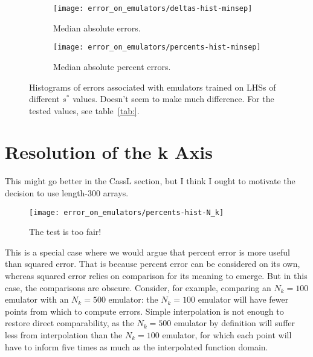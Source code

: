 \begin{figure}[ht!]
    \begin{subfigure}{0.35 \textheight}
    \centering
 		\texttt{[image: error\_on\_emulators/deltas-hist-minsep]}
 		\caption{Median absolute errors.}
 		\label{fig: minsep_experiment_deltas}
    \end{subfigure}
    \begin{subfigure}{0.35 \textheight}
    \centering
 		\texttt{[image: error\_on\_emulators/percents-hist-minsep]}
 		\caption{Median absolute percent errors.}
 		\label{fig: minsep_experiment_percerr}
    \end{subfigure}
        \centering
    \caption[Impact of $s^*$ on Accuracy]
    		{Histograms of errors associated with emulators trained on LHSs of
    			different $s^*$ values. Doesn't seem to make much difference. For the tested values, see
    			table~\ref{tab:}.}
    \label{fig: minsep_experiment}
\end{figure}

\section{Resolution of the k Axis}

This might go better in the CassL section, but I think I ought to motivate the 
decision to use length-300 arrays.

\begin{figure}[ht!]
  \centering
  \texttt{[image: error\_on\_emulators/percents-hist-N\_k]}
  \caption[Impact of $N_k$ on Accuracy]{The test is too fair!}
  \label{fig: Nk_experiment}
\end{figure}

This is a special case where we would argue that percent error is more useful 
than squared error.
That is because percent error can be considered on its own, whereas squared
error relies on comparison for its meaning to emerge. But in this case, the
comparisons are obscure. Consider, for example, comparing an $N_k = 100$
emulator with an $N_k = 500$ emulator: the $N_k = 100$ emulator will have
fewer points from which to compute errors. Simple interpolation is not enough
to restore direct comparability, as the $N_k = 500$ emulator by definition
will suffer less from interpolation than the $N_k = 100$ emulator, for which
each point will have to inform five times as much as the interpolated function
domain.

